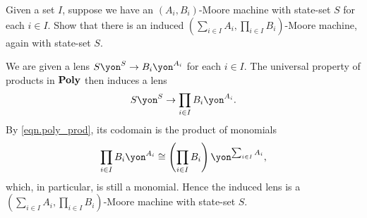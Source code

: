 \documentclass[Book-Poly]{subfiles}
\begin{document}
\begin{exercise}
Given a set $I$, suppose we have an $(A_i,B_i)$-Moore machine with state-set $S$ for each $i\in I$.
Show that there is an induced $\left(\sum_{i\in I}A_i, \prod_{i\in I}B_i\right)$-Moore machine, again with state-set $S$.
\begin{solution}
We are given a lens $S\yon^S\to B_i\yon^{A_i}$ for each $i\in I$.
The universal property of products in $\mathbf{Poly}$ then induces a lens
\[
    S\yon^S\to\prod_{i\in I}B_i\yon^{A_i}.
\]
By \eqref{eqn.poly_prod}, its codomain is the product of monomials
\[
  \prod_{i\in I}B_i\yon^{A_i}\iso\left(\prod_{i\in I}B_i\right)\yon^{\sum_{i\in I}A_i},
\]
which, in particular, is still a monomial.
Hence the induced lens is a $\left(\sum_{i\in I}A_i,\prod_{i\in I}B_i\right)$-Moore machine with state-set $S$.
\end{solution}
\end{exercise}
\end{document}
